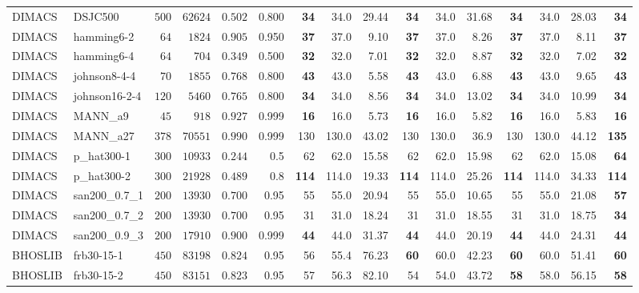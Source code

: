 \documentclass[draft,final]{vutinfth} %
\begin{document}
\begin{table}
{\begin{tabular}{llrrrr | rrr rrr rrr r}
        DIMACS & DSJC500 & $500$ & $62624$ & $0.502$ & 0.800 & \textbf{34} & 34.0 & 29.44 & \textbf{34} & 34.0 & 31.68 & \textbf{34} & 34.0 & 28.03 & \textbf{34}\\
        DIMACS & hamming6-2 & $64$ & $1824$ & $0.905$ & 0.950 & \textbf{37} & 37.0 & 9.10 & \textbf{37} & 37.0 & 8.26  & \textbf{37} & 37.0 & 8.11 & \textbf{37} \\
        DIMACS & hamming6-4 & $64$ & $704$ & $0.349$ & 0.500 & \textbf{32} & 32.0 & 7.01 & \textbf{32} & 32.0 & 8.87  & \textbf{32} & 32.0 & 7.02 & \textbf{32} \\
        DIMACS & johnson8-4-4 & $70$ & $1855$ & $0.768$ & 0.800 & \textbf{43} & 43.0 & 5.58 & \textbf{43} & 43.0 & 6.88  & \textbf{43} & 43.0 & 9.65 & \textbf{43} \\
        DIMACS & johnson16-2-4 & $120$ & $5460$ & $0.765$ & 0.800 & \textbf{34} & 34.0 & 8.56 & \textbf{34} & 34.0 & 13.02  & \textbf{34} & 34.0 & 10.99 & \textbf{34} \\
        DIMACS & MANN\_a9 & $45$ & $918$ & $0.927$ & 0.999 & \textbf{16} & 16.0 & 5.73 & \textbf{16} & 16.0 & 5.82  & \textbf{16} & 16.0 & 5.83 & \textbf{16} \\
        DIMACS & MANN\_a27 & $378$ & $70551$ & $0.990$ & 0.999 & 130 & 130.0 & 43.02 & 130 & 130.0 & 36.9 & 130 & 130.0 & 44.12 & \textbf{135}\\
        DIMACS & p\_hat300-1 & $300$ & $10933$ & $0.244$ & 0.5 & 62 & 62.0 & 15.58 & 62 & 62.0 & 15.98 & 62 & 62.0 & 15.08 & \textbf{64}\\
        DIMACS & p\_hat300-2 & $300$ & $21928$ & $0.489$ & 0.8 & \textbf{114} & 114.0 & 19.33 & \textbf{114} & 114.0 & 25.26 & \textbf{114} & 114.0 & 34.33 & \textbf{114} \\
        DIMACS & san200\_0.7\_1 & $200$ & $13930$ & $0.700$ & 0.95 & 55 & 55.0 & 20.94 & 55 & 55.0 & 10.65 & 55 & 55.0 & 21.08 & \textbf{57}\\
        DIMACS & san200\_0.7\_2 & $200$ & $13930$ & $0.700$ & 0.95 & 31 & 31.0 & 18.24 & 31 & 31.0 & 18.55 & 31 & 31.0 & 18.75 & \textbf{34}\\
        DIMACS & san200\_0.9\_3 & $200$ & $17910$ & $0.900$ & 0.999 & \textbf{44} & 44.0 & 31.37 & \textbf{44} & 44.0 & 20.19 & \textbf{44} & 44.0 & 24.31 & \textbf{44}\\
        BHOSLIB & frb30-15-1 & $450$ & $83198$ & $0.824$ & 0.95 & 56 & 55.4 & 76.23 & \textbf{60} & 60.0 & 42.23 & \textbf{60} & 60.0 & 51.41 & \textbf{60}\\
        BHOSLIB & frb30-15-2 & $450$ & $83151$ & $0.823$ & 0.95 & 57 & 56.3 & 82.10 & 54 & 54.0 & 43.72 & \textbf{58} & 58.0 & 56.15 & \textbf{58} \\

\end{tabular}}
\end{table}
\end{document}
